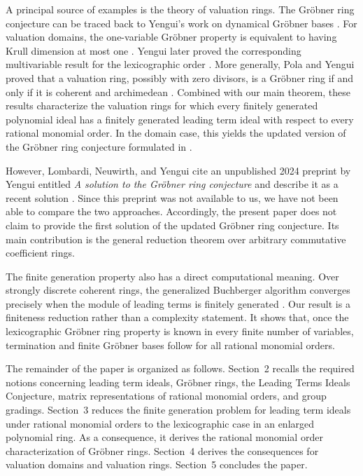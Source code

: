 \documentclass[preprint,12pt,3p]{elsarticle}
\theoremstyle{definition}
\theoremstyle{remark}
\begin{document}
A principal source of examples is the theory of valuation rings. The
Gr\"obner ring conjecture can be traced back to Yengui's work on
dynamical Gr\"obner bases \cite{Yengui2006}. For valuation domains,
the one-variable Gr\"obner property is equivalent to having Krull
dimension at most one \cite{LombardiSchusterYengui2012}. Yengui later
proved the corresponding multivariable result for the lexicographic
order \cite{Yengui2014Lex}. More generally, Pola and Yengui proved
that a valuation ring, possibly with zero divisors, is a Gr\"obner
ring if and only if it is coherent and archimedean
\cite{PolaYengui2014}. Combined with our main theorem, these results
characterize the valuation rings for which every finitely generated
polynomial ideal has a finitely generated leading term ideal with
respect to every rational monomial order. In the domain case, this
yields the updated version of the Gr\"obner ring conjecture formulated
in \cite{Yengui2021Counterexample}.
	
	However, Lombardi, Neuwirth, and Yengui cite an unpublished 2024
	preprint by Yengui entitled \emph{A solution to the Gr\"obner ring
		conjecture} and describe it as a recent solution
	\cite{LombardiNeuwirthYengui2026}. Since this preprint was not
	available to us, we have not been able to compare the two approaches.
	Accordingly, the present paper does not claim to provide the first
	solution of the updated Gr\"obner ring conjecture. Its main
	contribution is the general reduction theorem over arbitrary
	commutative coefficient rings.
	
	The finite generation property also has a direct computational
	meaning. Over strongly discrete coherent rings, the generalized
	Buchberger algorithm converges precisely when the module of leading
	terms is finitely generated
	\cite{LombardiNeuwirthYengui2026}. Our result is a finiteness
	reduction rather than a complexity statement. It shows that, once the
	lexicographic Gr\"obner ring property is known in every finite number
	of variables, termination and finite Gr\"obner bases follow for all
	rational monomial orders.
	
	The remainder of the paper is organized as follows. Section~2
	recalls the required notions concerning leading term ideals,
	Gr\"obner rings, the Leading Terms Ideals Conjecture, matrix
	representations of rational monomial orders, and group gradings.
	Section~3 reduces the finite generation problem for leading term
	ideals under rational monomial orders to the lexicographic case in an
	enlarged polynomial ring. As a consequence, it derives the rational
	monomial order characterization of Gr\"obner rings.
	Section~4 derives the consequences for valuation domains and
	valuation rings. Section~5 concludes the paper.
	
\end{document}
